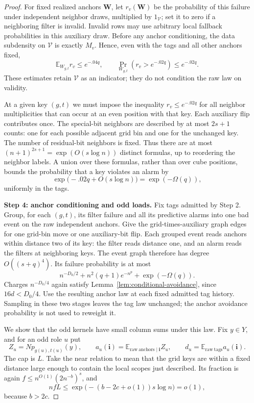 \begin{proof}
For fixed realized anchors \(\mathbf W\), let \(r_v(\mathbf W)\) be
the probability of this failure under independent neighbor draws,
multiplied by \(1_{\mathcal V}\); set it to zero if a neighboring filter
is invalid. Invalid rows may use arbitrary local fallback probabilities
in this auxiliary draw. Before any anchor conditioning, the data
subdensity on \(\mathcal V\) is exactly \(M_v\). Hence, even with the
tags and all other anchors fixed,
\[
 \mathbb E_{W_{g,t}}r_v\le e^{-.04q},\qquad
 \Pr_{W_{g,t}}(r_v>e^{-.02q})\le e^{-.02q}.
\]
These estimates retain \(\mathcal V\) as an indicator; they do not
condition the raw law on validity.

At a given key \((g,t)\) we must impose the inequality
\(r_v\le e^{-.02q}\) for all neighbor multiplicities that can occur at
an even position with that key. Each auxiliary flip contributes once.
The special-bit neighbors are described by at most \(2s+1\) counts:
one for each possible adjacent grid bin and one for the unchanged key.
The number of residual-bit neighbors is fixed. Thus there are at most
\((n+1)^{2s+1}=\exp(O(s\log n))\) distinct formulas, up to reordering
the neighbor labels. A union over these formulas, rather than over cube
positions, bounds the probability that a key violates an alarm by
\[
 \exp\big(-.02q+O(s\log n)\big)=\exp(-\Omega(q)),
\]
uniformly in the tags.

\noindent\textbf{Step 4: anchor conditioning and odd loads.}\quad
Fix tags admitted by Step 2. Group, for each \((g,t)\), its filter
failure and all its predictive alarms into one bad event on the raw
independent anchors. Give the grid-times-auxiliary graph edges for one
grid-bin move or one auxiliary-bit flip. Each grouped event reads
anchors within distance two of its key: the filter reads distance one,
and an alarm reads the filters at neighboring keys. The event graph
therefore has degree \(O((s+q)^4)\). Its failure probability is at most
\[
 n^{-D_0/2}+n^2(q+1)e^{-n^p}+\exp(-\Omega(q)).
\]
Charges \(n^{-D_0/4}\) again satisfy
Lemma~\ref{lem:conditional-avoidance}, since \(16d<D_0/4\). Use the
resulting anchor law at each fixed admitted tag history. Sampling in
these two stages leaves the tag law unchanged; the anchor avoidance
probability is not used to reweight it.

We show that the odd kernels have small column sums under this law. Fix
\(y\in Y\), and for an odd role \(u\) put
\[
 Z_u=Np_{g(u),t(u)}(y),\qquad
 a_u(\mathbf i)=\mathbb E_{\mathrm{raw\ anchors}\mid\mathbf i}Z_u,
 \qquad d_u=\mathbb E_{\mathrm{raw\ tags}}a_u(\mathbf i).
\]
The cap is \(L\). Take the near relation to mean that the grid keys are
within a fixed distance large enough to contain the local scopes just
described. Its fraction is again
\(f\le n^{O(1)}(2n^{-b})^s\), and
\[
 nfL\le\exp\big(-(b-2c+o(1))s\log n\big)=o(1),
\]
because \(b>2c\).


\end{proof}
